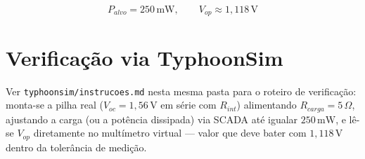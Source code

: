 \documentclass[12pt]{article}
\begin{document}
\[
\boxed{P_{alvo} = 250\,\text{mW}, \qquad V_{op} \approx 1{,}118\,\text{V}}
\]

\section*{Verificação via TyphoonSim}

Ver \texttt{typhoonsim/instrucoes.md} nesta mesma pasta para o roteiro de
verificação: monta-se a pilha real ($V_{oc}=1{,}56\,\text{V}$ em série com
$R_{int}$) alimentando $R_{carga}=5\,\Omega$, ajustando a carga (ou a
potência dissipada) via SCADA até igualar $250\,\text{mW}$, e lê-se $V_{op}$
diretamente no multímetro virtual --- valor que deve bater com
$1{,}118\,\text{V}$ dentro da tolerância de medição.
\end{document}
